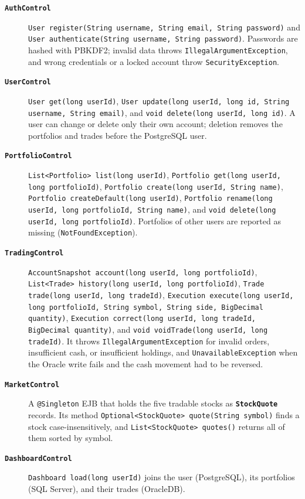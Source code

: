 \documentclass[12pt,a4paper]{article}
\newcommand{\code}[1]{\texttt{\small #1}}
\newcommand{\class}[1]{\textbf{\code{#1}}}
\begin{document}
\begin{description}
\item[\class{AuthControl}] \code{User register(String username, String email,
String password)} and \code{User authenticate(String username, String
password)}. Passwords are hashed with PBKDF2; invalid data throws
\code{IllegalArgumentException}, and wrong credentials or a locked account
throw \code{SecurityException}.

\item[\class{UserControl}] \code{User get(long userId)}, \code{User update(long
userId, long id, String username, String email)}, and \code{void delete(long
userId, long id)}. A user can change or delete only their own account;
deletion removes the portfolios and trades before the PostgreSQL user.

\item[\class{PortfolioControl}] \code{List<Portfolio> list(long userId)},
\code{Portfolio get(long userId, long portfolioId)}, \code{Portfolio
create(long userId, String name)}, \code{Portfolio createDefault(long
userId)}, \code{Portfolio rename(long userId, long portfolioId, String
name)}, and \code{void delete(long userId, long portfolioId)}. Portfolios of
other users are reported as missing (\code{NotFoundException}).

\item[\class{TradingControl}] \code{AccountSnapshot account(long userId, long
portfolioId)}, \code{List<Trade> history(long userId, long portfolioId)},
\code{Trade trade(long userId, long tradeId)}, \code{Execution execute(long
userId, long portfolioId, String symbol, String side, BigDecimal quantity)},
\code{Execution correct(long userId, long tradeId, BigDecimal quantity)}, and
\code{void voidTrade(long userId, long tradeId)}. It throws
\code{IllegalArgumentException} for invalid orders, insufficient cash, or
insufficient holdings, and \code{UnavailableException} when the Oracle write
fails and the cash movement had to be reversed.

\item[\class{MarketControl}] A \code{@Singleton} EJB that holds the five
tradable stocks as \class{StockQuote} records. Its method
\code{Optional<StockQuote> quote(String symbol)} finds a stock
case-insensitively, and \code{List<StockQuote> quotes()} returns all of them
sorted by symbol.

\item[\class{DashboardControl}] \code{Dashboard load(long userId)} joins the
user (PostgreSQL), its portfolios (SQL Server), and their trades (OracleDB).


\end{description}
\end{document}
